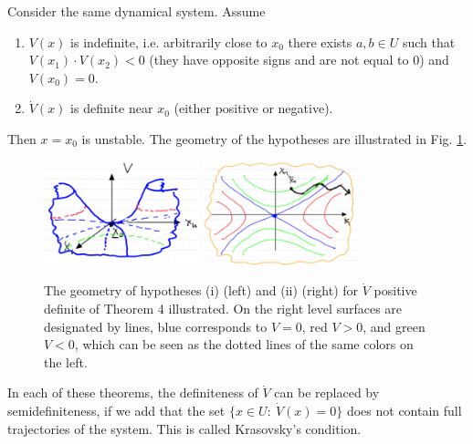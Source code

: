\begin{theorem}[Theorem 4]
	Consider the same dynamical system. Assume
	\begin{enumerate}
		\item $V(x)$ is indefinite, i.e. arbitrarily close to $x_0$ there exists $a,b \in U$ such that $V(x_1)\cdot V(x_2) <0$ (they have opposite signs and are not equal to 0) and $V(x_0)=0$.
		\item $\dot{V}(x)$ is definite near $x_0$ (either positive or negative).
	\end{enumerate}
	Then $x=x_0$ is unstable. The geometry of the hypotheses are  illustrated in Fig. \ref{fig:lyap_thm4_hypos}.
\end{theorem}

\begin{figure}[h!]
	\centering
	\includegraphics[width=0.4\textwidth]{figures/ch2/26lyap_thm4_hypos.png}
	\hspace{0.05\textwidth}
	\includegraphics[width=0.4\textwidth]{figures/ch2/26lyap_thm4_hypos2.png}
	\caption{The geometry of hypotheses (i) (left) and (ii) (right) for $\dot{V}$ positive definite of Theorem 4 illustrated. On the right level surfaces are designated by lines, blue corresponds to $V=0$, red $V>0$, and green $V<0$, which can be seen as the dotted lines of the same colors on the left.}
	\label{fig:lyap_thm4_hypos}
\end{figure}

\begin{remark}[]
	In each of these theorems, the definiteness of $ \dot{V}$ can be replaced by semidefiniteness, if we add that the set $\{x\in U:\ \dot{V}(x)=0 \}$ does not contain full trajectories of the system. This is called Krasovsky's condition.
\end{remark}

